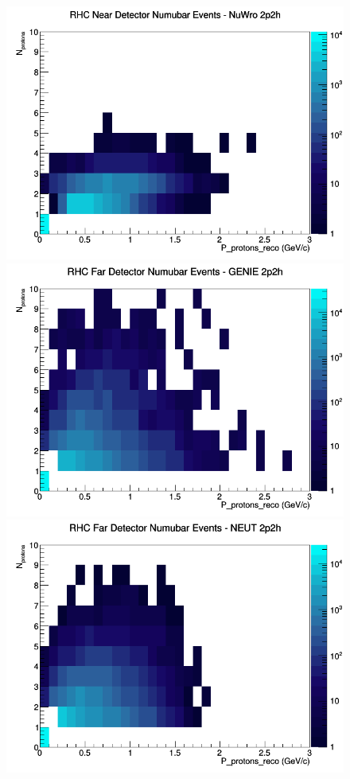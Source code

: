 \documentclass[12pt]{article}
\begin{document}
\begin{figure}[h]
\includegraphics[width=\linewidth]{eff_N_P/FGT/protons/2p2h_RHC_ND_numubar_N_P_NuWro.png}
\endminipage
\newline
{}
\includegraphics[width=\linewidth]{eff_N_P/FGT/protons/2p2h_RHC_FD_numubar_N_P_GENIE.png}
\endminipage
{}
\includegraphics[width=\linewidth]{eff_N_P/FGT/protons/2p2h_RHC_FD_numubar_N_P_NEUT.png}

\end{figure}
\end{document}
